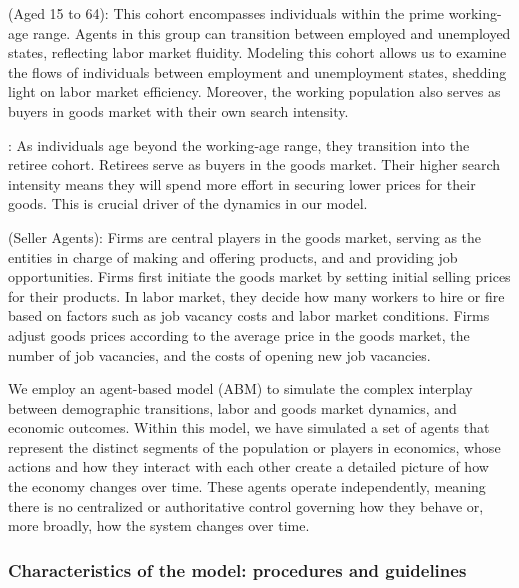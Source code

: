 \documentclass[ %
    final,
    scrbook,
    listoffigures,
    listoftables, 
    glossary]{cu-thesis}
\begin{document}
 (Aged 15 to 64): This cohort encompasses individuals within the prime working-age range. Agents in this group can transition between employed and unemployed states, reflecting labor market fluidity. 
Modeling this cohort allows us to examine the flows of individuals between employment and unemployment states, shedding light on labor market efficiency. Moreover, the working population also serves as buyers in goods market with their own search intensity.

: As individuals age beyond the working-age range, they transition into the retiree cohort. Retirees serve as buyers in the goods market. Their higher search intensity means they will spend more effort in securing lower prices for their goods. This is crucial driver of the dynamics in our model.

 (Seller Agents): Firms are central players in the goods market, serving as the entities in charge of making and offering products, and and providing job opportunities. Firms first initiate the goods market by setting initial selling prices for their products. In labor market, they decide how many workers to hire or fire based on factors such as job vacancy costs and labor market conditions. 
Firms adjust goods prices according to the average price in the goods market, the number of job vacancies, and the costs of opening new job vacancies.
  
\iffalse
We employ an agent-based model (ABM) to simulate the complex interplay between demographic transitions, labor and goods market dynamics, and economic outcomes. Within this model, we have simulated a set of agents that represent the distinct segments of the population or players in economics, whose actions and how they interact with each other create a detailed picture of how the economy changes over time. These agents operate independently, meaning there is no centralized or authoritative control governing how they behave or, more broadly, how the system changes over time.

\subsubsection{Characteristics of the model: procedures and guidelines}
\end{document}
